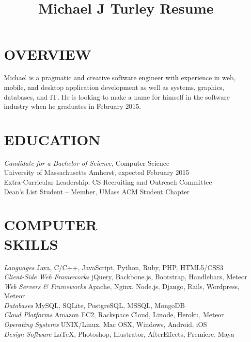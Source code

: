 \documentclass[line,margin]{res}
\begin{document}
\title{Michael J Turley Resume}

\address{248 Amherst Road Apt 217, Sunderland, MA 01375}
\address{781-264-6283  --  mike@miketurley.com -- github.com/mturley}

\begin{resume}
 
\section{OVERVIEW}
    Michael is a pragmatic and creative software engineer with experience in web, mobile, and desktop application development as well as systems, graphics, databases, and IT.  He is looking to make a name for himself in the software industry when he graduates in February 2015.
 
 
\section{EDUCATION}
    {\sl Candidate for a Bachelor of Science,} Computer Science \\
    University of Massachusetts Amherst, 
    expected February 2015 \\
    Extra-Curricular Leadership: CS Recruiting and Outreach Committee \\
    Dean's List Student -- Member, UMass ACM Student Chapter

 
\section{COMPUTER \\ SKILLS}
    {\sl Languages} \hfill Java, C/C++, JavaScript, Python, Ruby, PHP, HTML5/CSS3 \\
    {\sl Client-Side Web Frameworks} \hfill jQuery, Backbone.js, Bootstrap, Handlebars, Meteor \\
    {\sl Web Servers \& Frameworks} \hfill Apache, Nginx, Node.js, Django, Rails, Wordpress, Meteor \\
    {\sl Databases} \hfill MySQL, SQLite, PostgreSQL, MSSQL, MongoDB \\
    {\sl Cloud Platforms} \hfill Amazon EC2, Rackspace Cloud, Linode, Heroku, Meteor \\
    {\sl Operating Systems} \hfill UNIX/Linux, Mac OSX, Windows, Android, iOS \\
    {\sl Design Software} \hfill \LaTeX, Photoshop, Illustrator, AfterEffects, Premiere, Maya
 

\end{resume}
\end{document}
